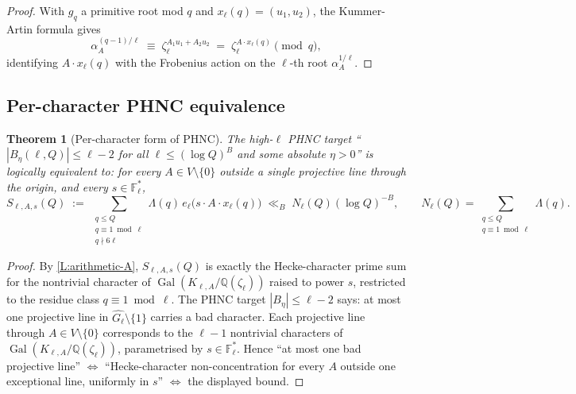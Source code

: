 \documentclass[11pt]{article}
\newtheorem{theorem}{Theorem}
\newcommand{\Q}{\mathbb Q}
\newcommand{\F}{\mathbb F}
\newcommand{\1}{\mathbf 1}
\begin{document}
\begin{proof}
With \(g_q\) a primitive root mod \(q\) and \(x_\ell(q)=(u_1,u_2)\), the Kummer-Artin formula gives
\[
\alpha_A^{(q-1)/\ell}\;\equiv\;\zeta_\ell^{A_1u_1+A_2u_2}\;=\;\zeta_\ell^{A\cdot x_\ell(q)}\pmod q,
\]
identifying \(A\cdot x_\ell(q)\) with the Frobenius action on the \(\ell\)-th root \(\alpha_A^{1/\ell}\).
\end{proof}

\subsection{Per-character PHNC equivalence}

\begin{theorem}[Per-character form of PHNC]\label{T:per-character}
The high-\(\ell\) PHNC target ``\(|B_\eta(\ell,Q)|\le\ell-2\) for all \(\ell\le(\log Q)^B\) and some absolute \(\eta>0\)'' is logically equivalent to: for every \(A\in V\setminus\{0\}\) outside a single projective line through the origin, and every \(s\in\F_\ell^*\),
\[
S_{\ell,A,s}(Q)\;:=\;\sum_{\substack{q\le Q\\ q\equiv 1\bmod\ell\\ q\nmid 6\ell}}\Lambda(q)\,e_\ell\bigl(s\cdot A\cdot x_\ell(q)\bigr)\;\ll_B\;N_\ell(Q)(\log Q)^{-B},\qquad N_\ell(Q)=\sum_{\substack{q\le Q\\ q\equiv 1\bmod\ell}}\Lambda(q).
\]
\end{theorem}

\begin{proof}
By \cref{L:arithmetic-A}, \(S_{\ell,A,s}(Q)\) is exactly the Hecke-character prime sum for the nontrivial character of \(\operatorname{Gal}(K_{\ell,A}/\Q(\zeta_\ell))\) raised to power \(s\), restricted to the residue class \(q\equiv 1\bmod\ell\).  The PHNC target \(|B_\eta|\le\ell-2\) says: at most one projective line in \(\widehat{G_\ell}\setminus\{1\}\) carries a bad character.  Each projective line through \(A\in V\setminus\{0\}\) corresponds to the \(\ell-1\) nontrivial characters of \(\operatorname{Gal}(K_{\ell,A}/\Q(\zeta_\ell))\), parametrised by \(s\in\F_\ell^*\).  Hence ``at most one bad projective line'' \(\Leftrightarrow\) ``Hecke-character non-concentration for every \(A\) outside one exceptional line, uniformly in \(s\)'' \(\Leftrightarrow\) the displayed bound.
\end{proof}
\end{document}
